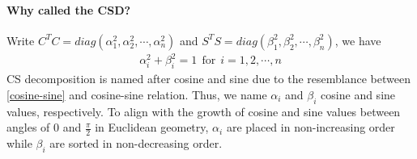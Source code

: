 \paragraph{Why called the CSD?}
Write $C^{T}C = diag(\alpha_1^{2}, \alpha_2^{2}, \cdots, \alpha_n^{2})$ 
and $S^{T}S = diag(\beta_1^{2}, \beta_2^{2}, \cdots, \beta_n^{2})$, 
we have 
\begin{align} \label{cosine-sine}
\alpha_i^{2} + \beta_i^{2} = 1 \ \  \text{for} \ \ i = 1,2,\cdots,n
\end{align}
CS decomposition is named after cosine and sine due to the 
resemblance between \eqref{cosine-sine} and cosine-sine relation. Thus, we name $\alpha_i$ and $\beta_i$ cosine and sine values, respectively. To align with the growth of cosine and sine values between angles of 0 and $\frac{\pi}{2}$ in Euclidean geometry, $\alpha_i$ are placed in non-increasing order while $\beta_i$ are sorted in non-decreasing order. 

